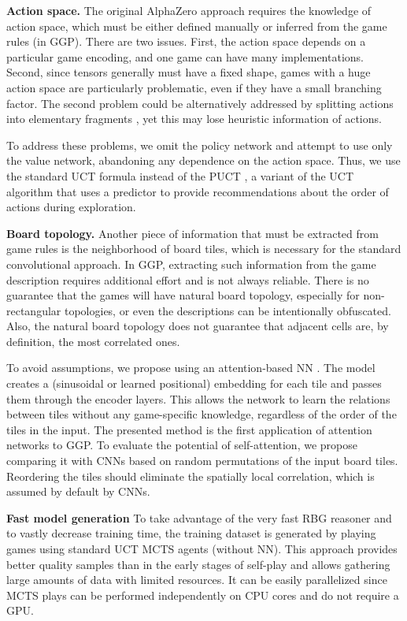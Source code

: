 \documentclass[letterpaper]{article} %
\begin{document}
\textbf{Action space.}
The original AlphaZero approach requires the knowledge of action space, which must be either defined manually or inferred from the game rules (in GGP).
There are two issues.
First, the action space depends on a particular game encoding, and one game can have many implementations. Second, since tensors generally must have a fixed shape, games with a huge action space are particularly problematic, even if they have a small branching factor.
The second problem could be alternatively addressed by splitting actions into elementary fragments \cite{Kowalski2022SplitMoves}, yet this may lose heuristic information of actions.

To address these problems, we omit the policy network and attempt to use only the value network, abandoning any dependence on the action space. Thus, we use the standard UCT formula instead of the PUCT \cite{Rosin2011}, a variant of the UCT algorithm that uses a predictor to provide recommendations about the order of actions during exploration.



\textbf{Board topology.}
Another piece of information that must be extracted from game rules is the neighborhood of board tiles, which is necessary for the standard convolutional approach.
In GGP, extracting such information from the game description requires additional effort and is not always reliable.
There is no guarantee that the games will have natural board topology, especially for non-rectangular topologies, or even the descriptions can be intentionally obfuscated.
Also, the natural board topology does not guarantee that adjacent cells are, by definition, the most correlated ones.

To avoid assumptions, we propose using an attention-based NN \cite{vaswani2017attention}. The model creates a (sinusoidal or learned positional) embedding for each tile and passes them through the encoder layers. This allows the network to learn the relations between tiles without any game-specific knowledge, regardless of the order of the tiles in the input. The presented method is the first application of attention networks to GGP.
To evaluate the potential of self-attention, we propose comparing it with CNNs based on random permutations of the input board tiles. Reordering the tiles should eliminate the spatially local correlation, which is assumed by default by CNNs.


\textbf{Fast model generation}
To take advantage of the very fast RBG reasoner and to vastly decrease training time, the training dataset is generated by playing games using standard UCT MCTS agents (without NN). This approach provides better quality samples than in the early stages of self-play and allows gathering large amounts of data with limited resources. It can be easily parallelized since MCTS plays can be performed independently on CPU cores and do not require a GPU.
\end{document}
